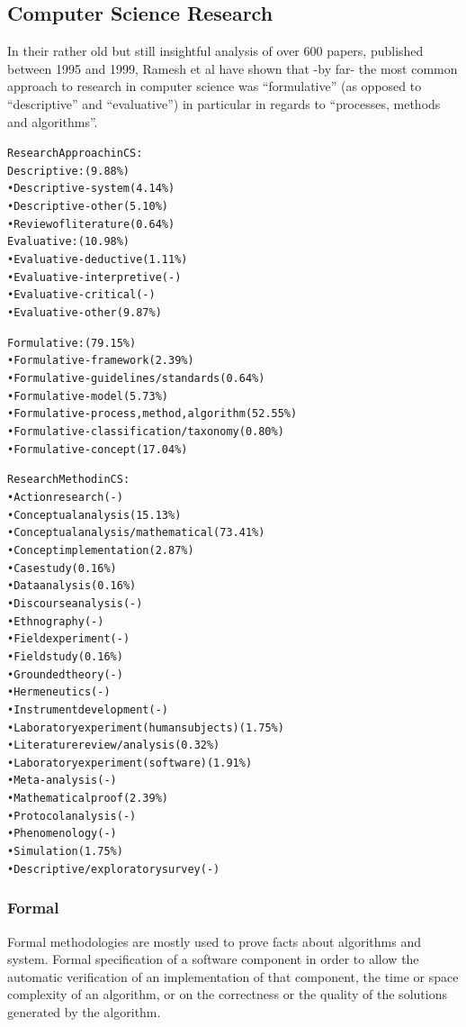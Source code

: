 \subsection{Computer Science Research}

In their rather old but still insightful analysis of over 600 papers, published between 1995 and 1999, Ramesh et al \autocite{Ramesh2004} have shown that -by far- the most common approach to research in computer science was ``formulative'' (as opposed to ``descriptive'' and ``evaluative'') in particular in regards to ``processes, methods and algorithms''.

\begin{alltt}
  Research Approach in CS:
  Descriptive: (9.88\%)
  •	Descriptive-system (4.14\%)
  •	Descriptive-other (5.10\%)
  •	Review of literature (0.64\%)
  Evaluative: (10.98\%)
  •	Evaluative-deductive (1.11\%)
  •	Evaluative-interpretive (-)
  •	Evaluative-critical (-)
  •	Evaluative-other (9.87\%)

  Formulative: (79.15\%)
  •	Formulative-framework (2.39\%)
  •	Formulative-guidelines/standards (0.64\%)
  •	Formulative-model (5.73\%)
  •	Formulative-process, method, algorithm (52.55\%)
  •	Formulative-classification/taxonomy (0.80\%)
  •	Formulative-concept (17.04\%)

   Research Method in CS:
  •	Action research (-)
  •	Conceptual analysis (15.13\%)
  •	Conceptual analysis/mathematical (73.41\%)
  •	Concept implementation (2.87\%)
  •	Case study (0.16\%)
  •	Data analysis (0.16\%)
  •	Discourse analysis (-)
  •	Ethnography (-)
  •	Field experiment (-)
  •	Field study (0.16\%)
  •	Grounded theory (-)
  •	Hermeneutics (-)
  •	Instrument development (-)
  •	Laboratory experiment (human subjects) (1.75\%)
  •	Literature review / analysis (0.32\%)
  •	Laboratory experiment (software) (1.91\%)
  •	Meta-analysis (-)
  •	Mathematical proof (2.39\%)
  •	Protocol analysis (-)
  •	Phenomenology (-)
  •	Simulation (1.75\%)
  •	Descriptive/exploratory survey (-)
\end{alltt}
\autocite{Ramesh2004}

\subsubsection*{Formal}

Formal methodologies are mostly used to prove facts about algorithms and system. Formal specification of a software component in order to allow the automatic verification of an implementation of that component, the time or space complexity of an algorithm, or on the correctness or the quality of the solutions generated by the algorithm. \autocite{Amaral}

